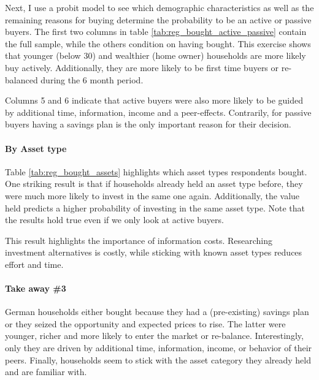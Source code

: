 \documentclass[ProjectABM]{subfiles}
\begin{document}

Next, I use a probit model to see which demographic characteristics as well as the remaining reasons for buying determine the probability to be an active or passive buyers. The first two columns in table \ref{tab:reg_bought_active_passive} contain the full sample, while the others condition on having bought. This exercise shows that younger (below 30) and wealthier (home owner) households are more likely buy actively. Additionally, they are more likely to be first time buyers or re-balanced during the 6 month period.

Columns 5 and 6 indicate that active buyers were also more likely to be guided by additional time, information, income and a peer-effects. Contrarily, for passive buyers having a savings plan is the only important reason for their decision.





\paragraph{By Asset type}
Table \ref{tab:reg_bought_assets} highlights which asset types respondents bought. One striking result is that if households already held an asset type before, they were much more likely to invest in the same one again. Additionally, the value held predicts a higher probability of investing in the same asset type. Note that the results hold true even if we only look at active buyers. 

\clearpage 




This result highlights the importance of information costs. Researching investment alternatives is costly, while sticking with known asset types reduces effort and time.%

\paragraph{Take away \#3}
German households either bought because they had a (pre-existing) savings plan or they seized the opportunity and expected prices to rise. The latter were younger, richer and more likely to enter the market or re-balance. Interestingly, only they are driven by additional time, information, income, or behavior of their peers. Finally, households seem to stick with the asset category they already held and are familiar with.
\end{document}
